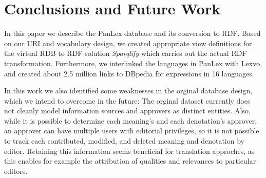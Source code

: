 \documentclass[sw]{iosart2c}
\newcommand*{\origtodo}{}
\let\origtodo\todo
\renewcommand*{\todo}{\origtodo[inline]}
\begin{document}




\section{Conclusions and Future Work}
\label{sec:conclusion}
In this paper we describe the PanLex database and its conversion to RDF.
Based on our URI and vocabulary design, we created appropriate view definitions
for the virtual RDB to RDF solution \emph{Sparqlify} which carries out
the actual RDF transformation.
Furthermore, we interlinked the languages in PanLex with Lexvo,
and created about 2.5 million links to DBpedia for expressions in 16 languages.

In this work we also identified some weaknesses in
the orginal database design,
which we intend to overcome in the future:
The orginal dataset currently does not cleanly model information sources and approvers
as distinct entities.
Also, while it is possible to determine each meaning's and each denotation's approver, an approver can have multiple users with editorial privileges, so it is not possible to track each contributed, modified, and deleted meaning and denotation by editor.
Retaining this information seems beneficial for translation approches,
as this enables for example the attribution of qualities and relevances to particular editors.




\end{document}
